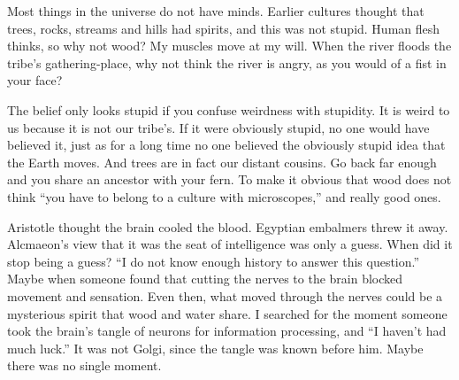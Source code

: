 
Most things in the universe do not have minds. Earlier cultures thought that trees, rocks, streams and hills had spirits, and this was not stupid. Human flesh thinks, so why not wood? My muscles move at my will. When the river floods the tribe's gathering-place, why not think the river is angry, as you would of a fist in your face? 

The belief only looks stupid if you confuse weirdness with stupidity. It is weird to us because it is not our tribe's. If it were obviously stupid, no one would have believed it, just as for a long time no one believed the obviously stupid idea that the Earth moves. And trees are in fact our distant cousins. Go back far enough and you share an ancestor with your fern. To make it obvious that wood does not think ``you have to belong to a culture with microscopes,'' and really good ones. 

Aristotle thought the brain cooled the blood. Egyptian embalmers threw it away. Alcmaeon's view that it was the seat of intelligence was only a guess. When did it stop being a guess? ``I do not know enough history to answer this question.'' Maybe when someone found that cutting the nerves to the brain blocked movement and sensation. Even then, what moved through the nerves could be a mysterious spirit that wood and water share.  I searched for the moment someone took the brain's tangle of neurons for information processing, and ``I haven't had much luck.'' It was not Golgi, since the tangle was known before him. Maybe there was no single moment.

